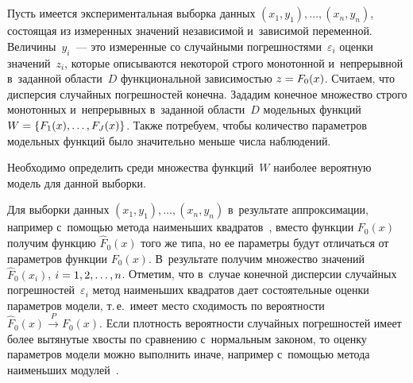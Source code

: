 \begin{multicols}{2}
\begin{figure*}[b] %
\vspace*{1pt}
\begin{minipage}[t]{79mm}
 \begin{center}
 \mbox{%
 \epsfxsize=77.766mm
 }
 \end{center}
 \vspace*{-9pt}
\end{minipage}
\hfill
\vspace*{1pt}
\begin{minipage}[t]{79mm}
 \begin{center}
 \mbox{%
 \epsfxsize=77.766mm
 }
 \end{center}
 \vspace*{-9pt}
\end{minipage}
\end{figure*}

  
  Пусть имеется экспериментальная выборка данных $(x_1,y_1),\ldots , (x_n, 
y_n)$, состоящая из измеренных значений независимой и~зависимой 
переменной. Величины~$y_i$~--- это измеренные со случайными 
погрешностями~$\varepsilon_i$ оценки значений~$z_i$, которые описываются 
некоторой строго монотонной и~непрерывной в~заданной области~$D$ 
функциональной зависимостью $z\hm= F_0(x)$. Считаем, что дис\-пер\-сия 
случайных погрешностей конечна. Зададим конечное множество строго 
монотонных и~непрерывных в~заданной области~$D$ модельных функций 
$W\hm= \{F_1(x), \ldots, F_J(x)\}$. Также потребуем, чтобы количество 
параметров модельных функций было значительно меньше числа наблюдений.
  
  Необходимо определить среди множества функций~$W$ наиболее 
вероятную модель для данной выборки.
  
  Для выборки данных $(x_1,y_1),\ldots, (x_n,y_n)$ в~результате 
аппроксимации, например с~помощью метода наименьших квадратов~\cite{8-t}, 
вместо функции $F_0(x)$ получим функцию $\hat{F}_0(x)$ того же типа, но ее 
параметры будут отличаться от параметров функции $F_0(x)$. В~результате 
получим множество значений $\hat{F}_0(x_i)$, $i\hm= 1,2,\ldots, n$. Отметим, 
что в~случае конечной дисперсии случайных погрешностей~$\varepsilon_i$ 
метод наименьших квадратов дает состоятельные оценки параметров модели, 
т.\,е.\ имеет место сходимость по вероятности $\hat{F}_0(x)\overset{P}{\to} 
F_0(x)$. Если плотность вероятности случайных погрешностей имеет более 
вытянутые хвосты по сравнению с~нормальным законом, то оценку параметров 
модели можно выполнить иначе, например с~помощью метода наименьших 
модулей~\cite{9-t}.
  

\end{multicols}
